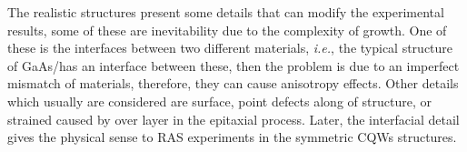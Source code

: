 The realistic structures present some details that can modify the experimental results, some of these are inevitability due to the complexity of growth. One of these is the interfaces between two different materials, \textit{i.e.}, the typical structure of GaAs/\algaas has an interface between these, then the problem is due to an imperfect mismatch of materials,
therefore, they can cause anisotropy effects. Other details which usually are considered are
surface, point defects along of structure, or strained caused by over layer in the epitaxial
process. Later, the interfacial detail gives the physical sense to RAS experiments in the
symmetric \gls{CQWs} structures.

